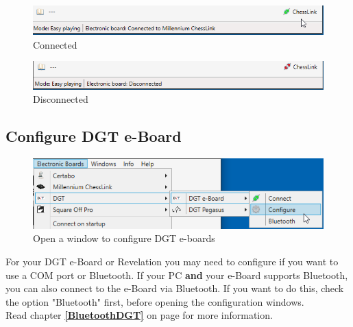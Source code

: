 \documentclass[11pt,a4paper]{article}
\begin{document}
\begin{figure}[H]
	\centering
	\includegraphics[scale=0.8]{MillenniumChessLink7.png}
	\caption{Connected}
	\label{fig:MillenniumChessLink7}
\end{figure}

\begin{figure}[H]
	\centering
	\includegraphics[scale=0.8]{MillenniumChessLink8.png}
	\caption{Disconnected}
	\label{fig:MillenniumChessLink8}
\end{figure}

\subsection{Configure DGT e-Board} \label{ConfigureDGTEBoard}
\begin{figure}[H]
	\centering
	\includegraphics[scale=0.8]{DGTEBoard1.png}
	\caption{Open a window to configure DGT e-boards }
	\label{fig:DGTEBoard1}
\end{figure}

For your DGT e-Board or Revelation you may need to configure if you want to use a COM port or Bluetooth. 
If your PC \textbf{and} your e-Board supports Bluetooth, you can also connect to the e-Board via Bluetooth. If you want to do this, check the option "Bluetooth" first, before opening the configuration windows.\\
Read chapter \textbf{\ref{BluetoothDGT}  } on page \pageref{BluetoothDGT} for more information.
\end{document}
